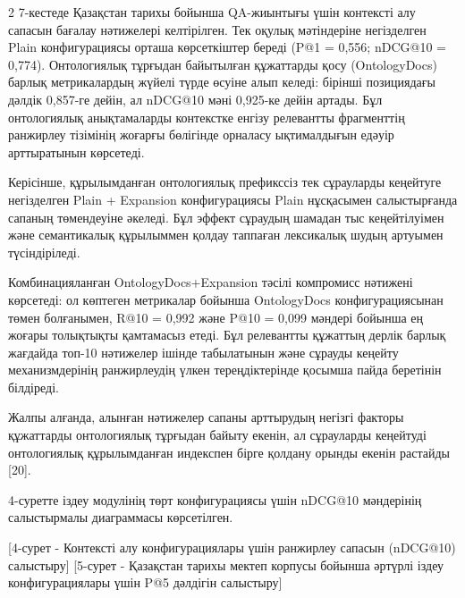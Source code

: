 \begin{multicols}{2}
7-кестеде Қазақстан тарихы бойынша QA-жиынтығы үшін контексті алу
сапасын бағалау нәтижелері келтірілген. Тек оқулық мәтіндеріне
негізделген Plain конфигурациясы орташа көрсеткіштер береді (P@1 =
0,556; nDCG@10 = 0,774). Онтологиялық тұрғыдан байытылған құжаттарды
қосу (OntologyDocs) барлық метрикалардың жүйелі түрде өсуіне алып
келеді: бірінші позициядағы дәлдік 0,857-ге дейін, ал nDCG@10 мәні
0,925-ке дейін артады. Бұл онтологиялық анықтамаларды контекстке енгізу
релевантты фрагменттің ранжирлеу тізімінің жоғарғы бөлігінде орналасу
ықтималдығын едәуір арттыратынын көрсетеді.

Керісінше, құрылымданған онтологиялық префикссіз тек сұрауларды
кеңейтуге негізделген Plain + Expansion конфигурациясы Plain нұсқасымен
салыстырғанда сапаның төмендеуіне әкеледі. Бұл эффект сұраудың шамадан
тыс кеңейтілуімен және семантикалық құрылыммен қолдау таппаған
лексикалық шудың артуымен түсіндіріледі.

Комбинацияланған OntologyDocs+Expansion тәсілі компромисс нәтижені
көрсетеді: ол көптеген метрикалар бойынша OntologyDocs конфигурациясынан
төмен болғанымен, R@10 = 0,992 және P@10 = 0,099 мәндері бойынша ең
жоғары толықтықты қамтамасыз етеді. Бұл релевантты құжаттың дерлік
барлық жағдайда топ-10 нәтижелер ішінде табылатынын және сұрауды кеңейту
механизмдерінің ранжирлеудің үлкен тереңдіктерінде қосымша пайда
беретінін білдіреді.

Жалпы алғанда, алынған нәтижелер сапаны арттырудың негізгі факторы
құжаттарды онтологиялық тұрғыдан байыту екенін, ал сұрауларды кеңейтуді
онтологиялық құрылымданған индекспен бірге қолдану орынды екенін
растайды {[}20{]}.

4-суретте іздеу модулінің төрт конфигурациясы үшін nDCG@10 мәндерінің
салыстырмалы диаграммасы көрсетілген.
\end{multicols}

\begin{figs}
[4-сурет - Контексті алу конфигурациялары үшін ранжирлеу сапасын
(nDCG@10) салыстыру]
[5-сурет - Қазақстан тарихы мектеп корпусы бойынша әртүрлі іздеу
конфигурациялары үшін P@5 дәлдігін салыстыру]
\end{figs}


